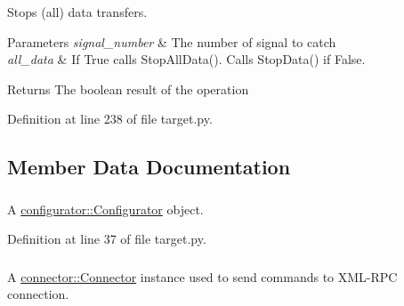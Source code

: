 \-Stops (all) data transfers. 


\begin{DoxyParams}{\-Parameters}
{\em signal\-\_\-number} & \-The number of signal to catch \\
\hline
{\em all\-\_\-data} & \-If \-True calls \-Stop\-All\-Data(). \-Calls \-Stop\-Data() if \-False. \\
\hline
\end{DoxyParams}
\begin{DoxyReturn}{\-Returns}
\-The boolean result of the operation 
\end{DoxyReturn}


\-Definition at line 238 of file target.\-py.



\subsection{\-Member \-Data \-Documentation}
\hypertarget{classpyrtai_1_1target_1_1_target_a81312c5e774f702d956b5e21f76b8d48}{
\subsubsection[{config}]{}}
\label{classpyrtai_1_1target_1_1_target_a81312c5e774f702d956b5e21f76b8d48}


\-A \hyperlink{classpyrtai_1_1configurator_1_1_configurator}{configurator\-::\-Configurator} object. 



\-Definition at line 37 of file target.\-py.

\hypertarget{classpyrtai_1_1target_1_1_target_ab10614e38c19644cfbd81ec3424df5c7}{
\subsubsection[{connection}]{}}
\label{classpyrtai_1_1target_1_1_target_ab10614e38c19644cfbd81ec3424df5c7}


\-A \hyperlink{classpyrtai_1_1connector_1_1_connector}{connector\-::\-Connector} instance used to send commands to \-X\-M\-L-\/\-R\-P\-C connection. 



